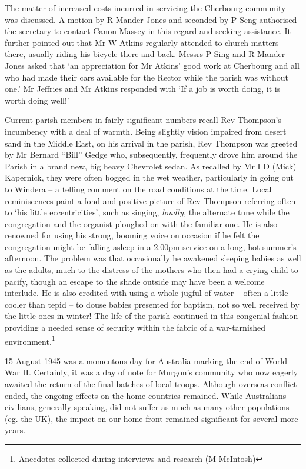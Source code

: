 The matter of increased costs incurred in servicing the Cherbourg community was discussed. A motion by R Mander Jones and seconded by P Seng authorised the secretary to contact Canon Massey in this regard and seeking assistance. It further pointed out that Mr W Atkins regularly attended to church matters there, usually riding his bicycle there and back. Messrs P Sing and R Mander Jones asked that `an appreciation for Mr Atkins' good work at Cherbourg and all who had made their cars available for the Rector while the parish was without one.' Mr Jeffries and Mr Atkins responded with `If a job is worth doing, it is worth doing well!'

Current parish members in fairly significant numbers recall Rev Thompson's incumbency with a deal of warmth. Being slightly vision impaired from desert sand in the Middle East, on his arrival in the parish, Rev Thompson was greeted by Mr Bernard ``Bill'' Gedge who, subsequently, frequently drove him around the Parish in a brand new, big heavy Chevrolet sedan. As recalled by Mr I D (Mick) Kapernick, they were often bogged in the wet weather, particularly in going out to Windera -- a telling comment on the road conditions at the time. Local reminiscences paint a fond and positive picture of Rev Thompson referring often to `his little eccentricities', such as singing, \emph{loudly,} the alternate tune while the congregation and the organist ploughed on with the familiar one. He is also renowned for using his strong, booming voice on occasion if he felt the congregation might be falling asleep in a 2.00pm service on a long, hot summer's afternoon. The problem was that occasionally he awakened sleeping babies as well as the adults, much to the distress of the mothers who then had a crying child to pacify, though an escape to the shade outside may have been a welcome interlude. He is also credited with using a whole jugful of water -- often a little cooler than tepid -- to douse babies presented for baptism, not so well received by the little ones in winter! The life of the parish continued in this congenial fashion providing a needed sense of security within the fabric of a war-tarnished environment.\footnote{Anecdotes collected during interviews and research (M McIntosh)}

15 August 1945 was a momentous day for Australia marking the end of World War II. Certainly, it was a day of note for Murgon's community who now eagerly awaited the return of the final batches of local troops. Although overseas conflict ended, the ongoing effects on the home countries remained. While Australians civilians, generally speaking, did not suffer as much as many other populations (eg. the UK), the impact on our home front remained significant for several more years.

